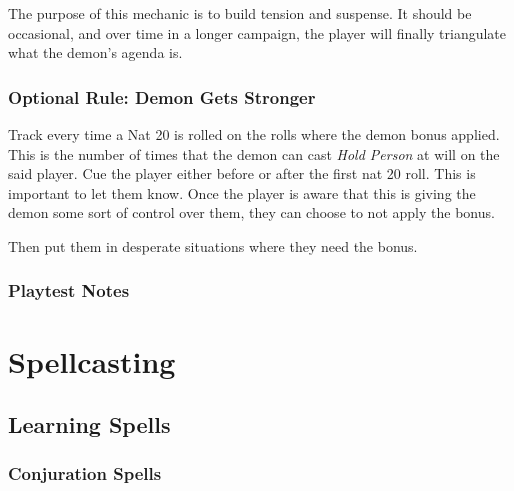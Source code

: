 \documentclass[twocolumn]{dndbook}
\begin{document}
The purpose of this mechanic is to build tension and suspense. It should be occasional, and over time in a longer campaign, the player will finally triangulate what the demon's agenda is.\par

\subsection{Optional Rule: Demon Gets Stronger}
Track every time a Nat 20 is rolled on the rolls where the demon bonus applied.
This is the number of times that the demon can cast \emph{Hold Person} at will on the said player.
Cue the player either before or after the first nat 20 roll.
This is important to let them know.
Once the player is aware that this is giving the demon some sort of control over them, they can choose to not apply the bonus.

Then put them in desperate situations where they need the bonus.\par



\subsection{Playtest Notes}



\chapter{Spellcasting}
\section{Learning Spells}

\subsection{Conjuration Spells}

\end{document}
